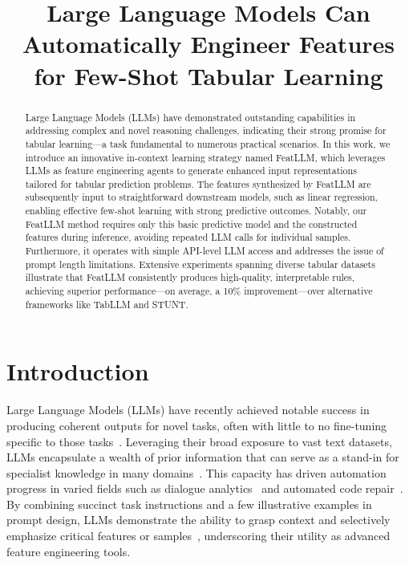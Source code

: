 \title{Large Language Models Can Automatically Engineer Features for Few-Shot Tabular Learning}

\begin{abstract}
Large Language Models (LLMs) have demonstrated outstanding capabilities in addressing complex and novel reasoning challenges, indicating their strong promise for tabular learning—a task fundamental to numerous practical scenarios. In this work, we introduce an innovative in-context learning strategy named \textsf{FeatLLM}, which leverages LLMs as feature engineering agents to generate enhanced input representations tailored for tabular prediction problems. The features synthesized by \textsf{FeatLLM} are subsequently input to straightforward downstream models, such as linear regression, enabling effective few-shot learning with strong predictive outcomes. Notably, our \textsf{FeatLLM} method requires only this basic predictive model and the constructed features during inference, avoiding repeated LLM calls for individual samples. Furthermore, it operates with simple API-level LLM access and addresses the issue of prompt length limitations. Extensive experiments spanning diverse tabular datasets illustrate that \textsf{FeatLLM} consistently produces high-quality, interpretable rules, achieving superior performance—on average, a 10\% improvement—over alternative frameworks like TabLLM and STUNT.
\end{abstract}

\section{Introduction}
Large Language Models (LLMs) have recently achieved notable success in producing coherent outputs for novel tasks, often with little to no fine-tuning specific to those tasks~\cite{creswell2022selection,imani2023mathprompter,taylor2022galactica}. Leveraging their broad exposure to vast text datasets, LLMs encapsulate a wealth of prior information that can serve as a stand-in for specialist knowledge in many domains~\cite{Genomes2021,singhal2023large,wilcox2003role}. This capacity has driven automation progress in varied fields such as dialogue analytics~\cite{finch2023leveraging} and automated code repair~\cite{fan2023automated}. By combining succinct task instructions and a few illustrative examples in prompt design, LLMs demonstrate the ability to grasp context and selectively emphasize critical features or samples~\cite{brown2020language,zhao2023survey}, underscoring their utility as advanced feature engineering tools.

